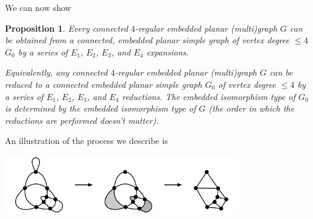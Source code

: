 \documentclass[amsmath,secnumarabic,floatfix,amssymb,nofootinbib,nobibnotes,letterpaper,11pt,tightenlines,showkeys]{revtex4}
\newtheorem{proposition}[theorem]{Proposition}
\theoremstyle{definition}
\newcommand{\loopinsert}{E_1}
\newcommand{\edgedouble}{E_2}
\newcommand{\cutedgedouble}{E_3}
\newcommand{\pairinsert}{E_4}
\let\mgp=\marginpar \marginparwidth18mm \marginparsep1mm
\def\marginpar#1{\mgp{\raggedright\tiny #1}}
\let\lbl=\label
\def\label#1{\lbl{#1}\ifinner\else\marginpar{\ref{#1} #1}\ignorespaces\fi}
\begin{document}
We can now show

\begin{proposition}
Every connected $4$-regular embedded planar (multi)graph $G$ can be obtained from a connected, embedded planar simple graph of vertex degree $\leq 4$ $G_0$ by a series of $\loopinsert$, $\edgedouble$, $\cutedgedouble$, and $\pairinsert$ expansions. 

Equivalently, any connected $4$-regular embedded planar (multi)graph $G$ can be reduced to a connected embedded planar simple graph $G_0$ of vertex degree $\leq 4$ by a series of $\loopinsert$, $\edgedouble$, $\cutedgedouble$, and $\pairinsert$ reductions. The embedded isomorphism type of $G_0$ is determined by the  embedded isomorphism type of $G$ (the order in which the reductions are performed doesn't matter). 
\label{prop:reduce}
\end{proposition}

An illustration of the process we describe is 
\begin{center}
\includegraphics[width=4in]{expansion-from-simple-graph}
\end{center}
\end{document}
